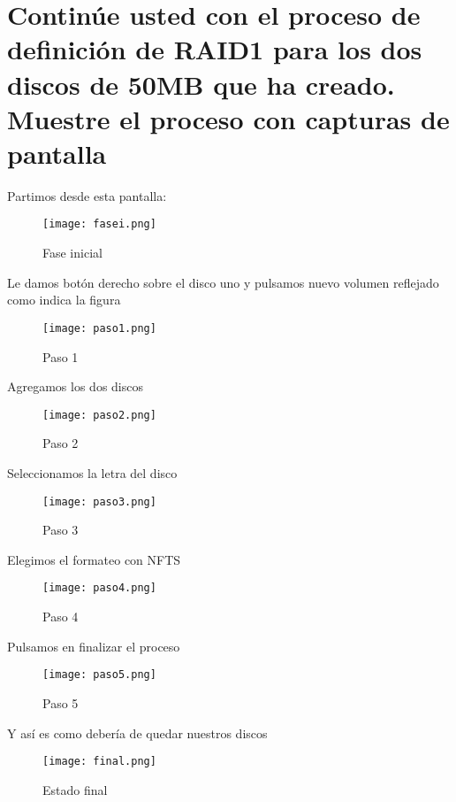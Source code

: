 \section{Continúe usted con el proceso de definición de RAID1 para los dos discos de 50MB que ha creado. Muestre el proceso con capturas de pantalla}
Partimos desde esta pantalla:
\begin{figure}[H] 

\texttt{[image: fasei.png]}  
\label{figura10:}
\caption{Fase inicial}
\end{figure}
Le damos botón derecho sobre el disco uno y pulsamos nuevo volumen reflejado como indica la figura
\begin{figure}[H] 
\centering
\texttt{[image: paso1.png]}  
\label{figura11:}
\caption{Paso 1}
\end{figure}
Agregamos los dos discos
\begin{figure}[H] 
\centering
\texttt{[image: paso2.png]}  
\label{figura12:}
\caption{Paso 2}
\end{figure}
Seleccionamos la letra del disco
\begin{figure}[H] 
\centering
\texttt{[image: paso3.png]}  
\label{figura13:}
\caption{Paso 3}
\end{figure}
Elegimos el formateo con NFTS
\begin{figure}[H] 
\centering
\texttt{[image: paso4.png]}  
\label{figura14:}
\caption{Paso 4}
\end{figure}
Pulsamos en finalizar el proceso
\begin{figure}[H] 
\centering
\texttt{[image: paso5.png]}  
\label{figura15:}
\caption{Paso 5}
\end{figure}
Y así es como debería de quedar nuestros discos
\begin{figure}[H] 
\centering
\texttt{[image: final.png]}  
\label{figura16:}
\caption{Estado final}
\end{figure}

